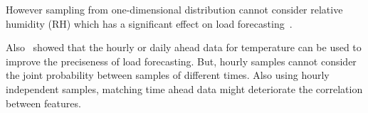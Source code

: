 \documentclass[journal]{IEEEtran} %
\begin{document}
However sampling from one-dimensional distribution cannot consider relative humidity (RH) which has a significant effect on load forecasting~\cite{xie2016relative}. 

Also~\cite{xie2017variable} showed that the hourly or daily ahead data for temperature can be used to improve the preciseness of load forecasting. But, hourly samples cannot consider the joint probability between samples of different times. Also using hourly independent samples, matching time ahead data might deteriorate the correlation between features.  


\end{document}
